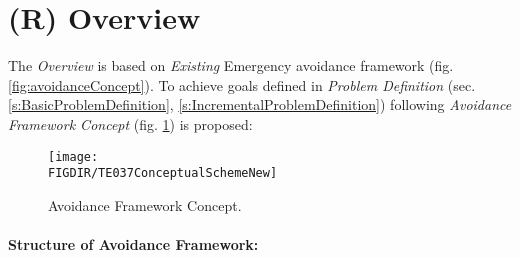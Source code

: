 \newpage    
\section{(R) Overview}\label{s:approachOverview}

\noindent The \emph{Overview} is based on \emph{Existing} Emergency avoidance framework \cite{gomola2017obstacle} (fig. \ref{fig:avoidanceConcept}). To achieve goals defined in \emph{Problem Definition} (sec. \ref{s:BasicProblemDefinition}, \ref{s:IncrementalProblemDefinition}) following \emph{Avoidance Framework Concept} (fig. \ref{fig:AvoidanceFrameworkConceptNew}) is proposed:

\begin{figure}[H]
    \centering
    \texttt{[image: \\FIGDIR/TE037ConceptualSchemeNew]} 
    \caption{Avoidance Framework Concept.}
    \label{fig:AvoidanceFrameworkConceptNew}
\end{figure}


\paragraph{Structure of Avoidance Framework:}


